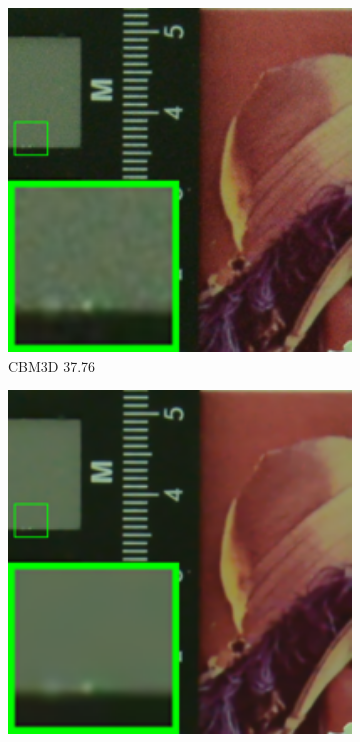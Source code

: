\begin{figure}
\begin{subfigure}[t]{0.19\textwidth}
        \includegraphics[width=1\textwidth]{images/mcwnnm/cc/resize_br_CBM3D_CC15_d800_iso1600_2.png}
		\caption{CBM3D 37.76}
    \end{subfigure}
    \hfill
    \begin{subfigure}[t]{0.19\textwidth}
        \centering
        \includegraphics[width=1\textwidth]{images/mcwnnm/cc/resize_br_TRD_CC15_d800_iso1600_2.png}

\end{subfigure}
\end{figure}
